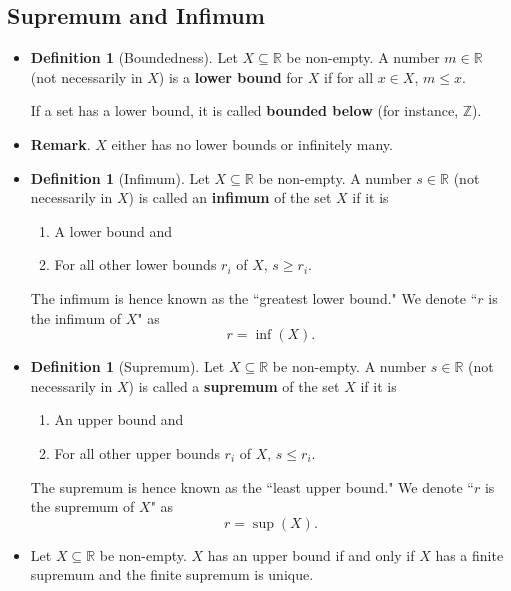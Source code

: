 \documentclass{article}
\newcommand{\Z}{\mathbb{Z}}
\newcommand{\R}{\mathbb{R}}
\newcommand{\?}{\stackrel{?}{=}}
\theoremstyle{definition} %
\newtheorem{definition}[subsection]{Definition} %
\begin{document}
\subsection{Supremum and Infimum}

\begin{itemize}
    \item[] 
    \begin{definition}[Boundedness]
        Let $X \subseteq \R$ be non-empty. A number $m \in \R$ (not necessarily in $X$) is a \textbf{lower bound} for $X$ if for all $x \in X$, $m \leq x$.
    \end{definition}
    If a set has a lower bound, it is called \textbf{bounded below} (for instance, $\Z$).
    \item \textbf{Remark}. $X$ either has no lower bounds or infinitely many.
    \item[]
    \begin{definition}[Infimum]
        Let $X \subseteq \R$ be non-empty. A number $s \in \R$ (not necessarily in $X$) is called an \textbf{infimum} of the set $X$ if it is
    \begin{enumerate}[label=(\arabic*)]
        \item A lower bound and
        \item For all other lower bounds $r_i$ of $X$, $s \geq r_i$.
    \end{enumerate}
    The infimum is hence known as the ``greatest lower bound." We denote ``$r$ is the infimum of $X$" as
    $$r = \inf(X).$$
    \end{definition}
    \item[]
    \begin{definition}[Supremum]
        Let $X \subseteq \R$ be non-empty. A number $s \in \R$ (not necessarily in $X$) is called a \textbf{supremum} of the set $X$ if it is
    \begin{enumerate}[label=(\arabic*)]
        \item An upper bound and
        \item For all other upper bounds $r_i$ of $X$, $s \leq r_i$.
    \end{enumerate}
    The supremum is hence known as the ``least upper bound." We denote ``$r$ is the supremum of $X$" as
    $$r = \sup(X).$$
    \end{definition}
    \item[]
    \begin{theorem}
         Let $X \subseteq \R$ be non-empty. $X$ has an upper bound if and only if $X$ has a finite supremum and the finite supremum is unique.

\end{theorem}
\end{itemize}
\end{document}
